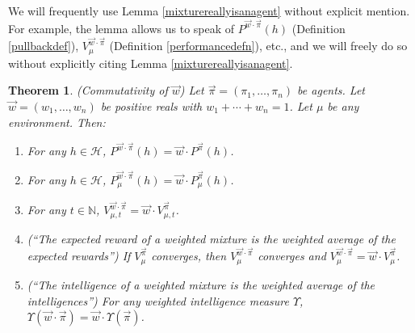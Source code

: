 \documentclass[twoside]{article}
\newtheorem{theorem}{Theorem}
\begin{document}
We will frequently use Lemma \ref{mixturereallyisanagent} without explicit mention.
For example, the lemma allows us to speak of $P^{\vec w\cdot \vec\pi}(h)$
(Definition \ref{pullbackdef}), $V^{\vec w\cdot\vec\pi}_{\mu}$
(Definition \ref{performancedefn}), etc., and we will freely do so without
explicitly citing Lemma \ref{mixturereallyisanagent}.

\begin{theorem}
\label{maintheorem}
    (Commutativity of $\vec w$)
    Let $\vec\pi=(\pi_1,\ldots,\pi_n)$ be agents.
    Let $\vec w=(w_1,\ldots,w_n)$ be positive reals with
    $w_1+\cdots+w_n=1$. Let $\mu$ be any environment.
    Then:
    \begin{enumerate}
        \item
        For any $h\in\mathcal H$,
        $P^{\vec w\cdot \vec\pi}(h)=\vec w\cdot {P^{\vec\pi}}(h)$.
        \item
        For any $h\in\mathcal H$,
        $P^{\vec w\cdot \vec\pi}_\mu(h)=\vec w \cdot P^{\vec\pi}_\mu(h)$.
        \item
        For any $t\in\mathbb N$,
        $V^{\vec w\cdot \vec\pi}_{\mu,t}=\vec w\cdot V^{\vec\pi}_{\mu,t}$.
        \item
        (``The expected reward of a weighted mixture is the weighted
        average of the expected rewards'')
        If $V^{\vec\pi}_\mu$ converges, then $V^{\vec w\cdot\vec\pi}_\mu$
        converges and $V^{\vec w\cdot\vec\pi}_\mu=\vec w\cdot V^{\vec\pi}_\mu$.
        \item
        (``The intelligence of a weighted mixture is the weighted average
        of the intelligences'')
        For any weighted intelligence measure $\Upsilon$,
        $\Upsilon(\vec w\cdot\vec\pi)=\vec w\cdot\Upsilon(\vec\pi)$.
    \end{enumerate}
\end{theorem}
\end{document}

